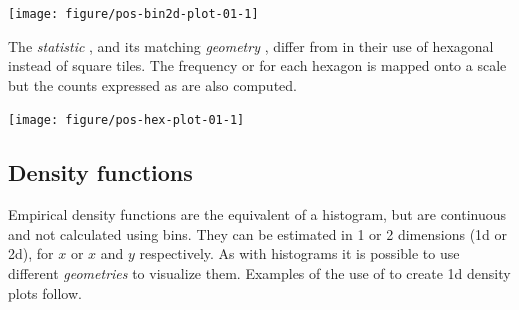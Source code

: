 \documentclass[krantz2]{krantz}\usepackage{knitr}%
\begin{document}
\begin{knitrout}\footnotesize
{}\color{fgcolor}\begin{kframe}
\begin{alltt}
  \hlopt{+}
  \hlstd{(} \hlstd{=} \hlstd{)} \hlopt{+}
  \hlstd{()}
\end{alltt}
\end{kframe}

{\centering \texttt{[image: figure/pos-bin2d-plot-01-1]} 

}



\end{knitrout}

The \emph{statistic} , and its matching \emph{geometry} , differ from  in their use of hexagonal instead of square tiles. The frequency or  for each hexagon is mapped onto a  scale but the counts expressed as  are also computed.

\begin{knitrout}\footnotesize
{}\color{fgcolor}\begin{kframe}
\begin{alltt}
  \hlopt{+}
  \hlstd{(} \hlstd{=} \hlstd{)} \hlopt{+}
  \hlstd{()}
\end{alltt}
\end{kframe}

{\centering \texttt{[image: figure/pos-hex-plot-01-1]} 

}



\end{knitrout}

\subsection{Density functions}\label{sec:plot:density}
Empirical density functions are the equivalent of a histogram, but are continuous and not calculated using bins. They can be estimated in 1 or 2 dimensions (1d or 2d), for $x$ or $x$ and $y$ respectively. As with histograms it is possible to use different \emph{geometries} to visualize them. Examples of the use of  to create 1d density plots follow.
\end{document}
